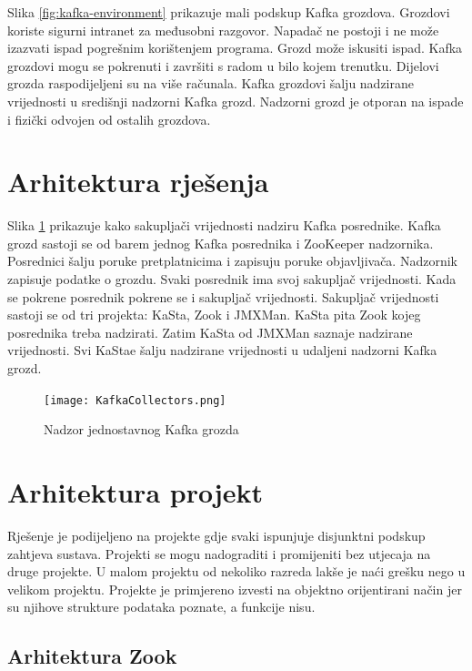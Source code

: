 \documentclass[utf8, diplomski, lmodern, numeric]{fer}
\begin{document}
Slika \ref{fig:kafka-environment} prikazuje mali podskup Kafka grozdova. Grozdovi koriste sigurni intranet za međusobni razgovor. Napadač ne postoji i ne može izazvati ispad pogrešnim korištenjem programa. Grozd može iskusiti ispad. Kafka grozdovi mogu se pokrenuti i završiti s radom u bilo kojem trenutku. Dijelovi grozda raspodijeljeni su na više računala. Kafka grozdovi šalju nadzirane vrijednosti u središnji nadzorni Kafka grozd. Nadzorni grozd je otporan na ispade i fizički odvojen od ostalih grozdova.


\section{Arhitektura rješenja}

Slika \ref{fig:collectors} prikazuje kako sakupljači vrijednosti nadziru Kafka posrednike. Kafka grozd sastoji se od barem jednog Kafka posrednika i ZooKeeper nadzornika. Posrednici šalju poruke pretplatnicima i zapisuju poruke objavljivača. Nadzornik zapisuje podatke o grozdu. Svaki posrednik ima svoj sakupljač vrijednosti. Kada se pokrene posrednik pokrene se i sakupljač vrijednosti. Sakupljač vrijednosti sastoji se od tri projekta: KaSta, Zook i JMXMan. KaSta pita Zook kojeg posrednika treba nadzirati. Zatim KaSta od JMXMan saznaje nadzirane vrijednosti. Svi KaStae šalju nadzirane vrijednosti u udaljeni nadzorni Kafka grozd.

\begin{figure}[H]
    \centering
    \texttt{[image: KafkaCollectors.png]}
    \caption{Nadzor jednostavnog Kafka grozda}
    \label{fig:collectors}
\end{figure}


\section{Arhitektura projekt}

Rješenje je podijeljeno na projekte gdje svaki ispunjuje disjunktni podskup zahtjeva sustava. Projekti se mogu nadograditi i promijeniti bez utjecaja na druge projekte. U malom projektu od nekoliko razreda lakše je naći grešku nego u velikom projektu. Projekte je primjereno izvesti na objektno orijentirani način jer su njihove strukture podataka poznate, a funkcije nisu.

\subsection{Arhitektura Zook}
\end{document}
